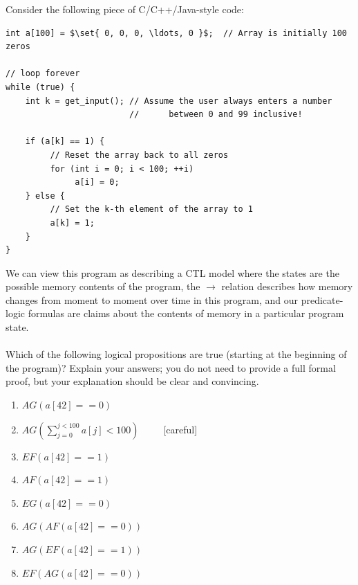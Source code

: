 \documentclass[12pt,letterpaper,boxed,cm]{hmcpset}
\newcommand{\pn}[1]{\left( #1 \right)}
\newcommand{\bk}[1]{\left[ #1 \right]}
\newcommand{\set}[1]{\left\{#1\right\}}
\newcommand{\ra}[0]{\rightarrow}
\begin{document}
\begin{solution}
    \vfill
\end{solution}
\newpage

\begin{problem}[2.]
    [24 points] Consider the following piece of C/C++/Java-style code:
    \begin{lstlisting}[mathescape]
int a[100] = $\set{ 0, 0, 0, \ldots, 0 }$;  // Array is initially 100 zeros

// loop forever
while (true) {
    int k = get_input(); // Assume the user always enters a number
                         //      between 0 and 99 inclusive!

    if (a[k] == 1) {
         // Reset the array back to all zeros
         for (int i = 0; i < 100; ++i)
              a[i] = 0;
    } else {
         // Set the k-th element of the array to 1
         a[k] = 1;
    }
}
    \end{lstlisting}
    We can view this program as describing a CTL model where the states are the possible memory contents of the program, the $\ra$ relation describes how memory changes from moment to moment over time in this program, and our predicate-logic formulas are claims about the contents of memory in a particular program state.\\\\
    Which of the following logical propositions are true (starting at the beginning of the program)?  Explain your answers; you do not need to provide a full formal proof, but your explanation should be clear and convincing.
    \begin{enumerate}[label=\Alph*.]
        \item $AG  (a[42] == 0)$
        \item $\displaystyle AG\pn{\sum_{j=0}^{j<100}a\bk{j}<100}$~~~~~[careful]
        \item $EF  (a[42] == 1)$
        \item $AF  (a[42] == 1)$
        \item $EG  (a[42] == 0)$
        \item $AG  (AF  (a[42] == 0))$
        \item $AG  (EF  (a[42] == 1))$
        \item $EF  (AG  (a[42] == 0))$
    \end{enumerate}
\end{problem}
\end{document}
